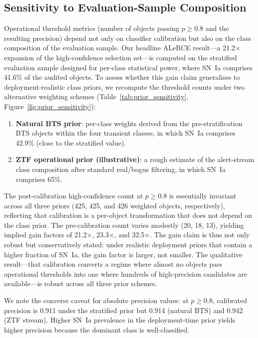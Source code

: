 \documentclass[twocolumn]{aastex631}
\begin{document}
\subsection{Sensitivity to Evaluation-Sample Composition}
\label{sec:prior_sensitivity}

Operational threshold metrics (number of objects passing $p \geq 0.8$
and the resulting precision) depend not only on classifier calibration
but also on the class composition of the evaluation sample. Our headline
ALeRCE result---a 21.2$\times$ expansion of the high-confidence
selection set---is computed on the stratified evaluation sample
designed for per-class statistical power, where SN~Ia comprises
41.6\% of the audited objects. To assess whether this gain claim
generalises to deployment-realistic class priors, we recompute the
threshold counts under two alternative weighting schemes
(Table~\ref{tab:prior_sensitivity}, Figure~\ref{fig:prior_sensitivity}):

\begin{enumerate}
\item \textbf{Natural BTS prior}: per-class weights derived from the
pre-stratification BTS objects within the four transient classes,
in which SN~Ia comprises 42.9\% (close to the stratified value).
\item \textbf{ZTF operational prior (illustrative)}: a rough estimate
of the alert-stream class composition after standard real/bogus
filtering, in which SN~Ia comprises 65\%.
\end{enumerate}

The post-calibration high-confidence count at $p \geq 0.8$ is essentially
invariant across all three priors (425, 425, and 426 weighted objects,
respectively), reflecting that calibration is a per-object transformation
that does not depend on the class prior. The pre-calibration count
varies modestly (20, 18, 13), yielding implied gain factors of
21.2$\times$, 23.3$\times$, and 32.5$\times$. The gain claim is thus
not only robust but conservatively stated: under realistic deployment
priors that contain a higher fraction of SN~Ia, the gain factor is
larger, not smaller. The qualitative result---that calibration converts
a regime where almost no objects pass operational thresholds into one
where hundreds of high-precision candidates are available---is robust
across all three prior schemes.

We note the converse caveat for absolute precision values: at
$p \geq 0.8$, calibrated precision is 0.911 under the stratified prior
but 0.914 (natural BTS) and 0.942 (ZTF stream). Higher SN~Ia
prevalence in the deployment-time prior yields higher precision because
the dominant class is well-classified.
\end{document}
